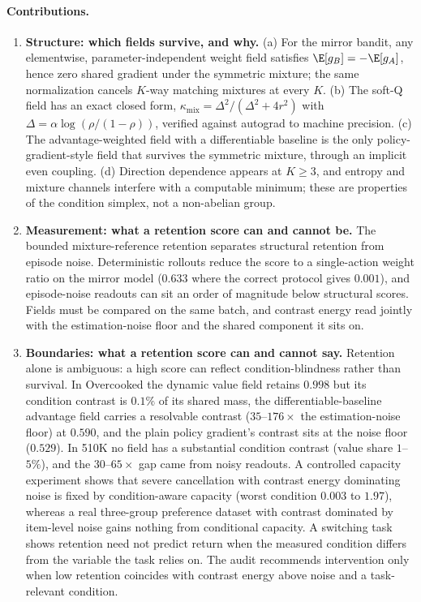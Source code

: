 \documentclass{article}
\newcommand{\kmix}{\kappa_{\mathrm{mix}}}
\begin{document}
\paragraph{Contributions.}
\begin{enumerate}
\item \textbf{Structure: which fields survive, and why.}
  (a) For the mirror bandit, any elementwise, parameter-independent weight
  field satisfies $\E[g_B]=-\E[g_A]$, hence zero shared gradient under the
  symmetric mixture; the same normalization cancels $K$-way matching mixtures
  at every $K$. (b) The soft-Q field has an exact closed form,
  $\kmix=\Delta^2/(\Delta^2+4r^2)$ with
  $\Delta=\alpha\log(\rho/(1-\rho))$, verified against autograd to machine
  precision. (c) The advantage-weighted field with a differentiable baseline
  is the only policy-gradient-style field that survives the symmetric mixture,
  through an implicit even coupling. (d) Direction dependence appears at
  $K\ge 3$, and entropy and mixture channels interfere with a computable
  minimum; these are properties of the condition simplex, not a non-abelian
  group.
\item \textbf{Measurement: what a retention score can and cannot be.}
  The bounded mixture-reference retention separates structural retention from
  episode noise. Deterministic rollouts reduce the score to a single-action
  weight ratio on the mirror model ($0.633$ where the correct protocol gives
  $0.001$), and episode-noise readouts can sit an order of magnitude below
  structural scores. Fields must be compared on the same batch, and contrast
  energy read jointly with the estimation-noise floor and the shared
  component it sits on.
\item \textbf{Boundaries: what a retention score can and cannot say.}
  Retention alone is ambiguous: a high score can reflect condition-blindness
  rather than survival. In Overcooked the dynamic value field retains $0.998$
  but its condition contrast is $0.1\%$ of its shared mass, the
  differentiable-baseline advantage field carries a resolvable contrast
  ($35$--$176\times$ the estimation-noise floor) at $0.590$, and the plain
  policy gradient's contrast sits at the noise floor ($0.529$). In 510K no
  field has a substantial condition contrast (value share $1$--$5\%$), and the
  $30$--$65\times$ gap came from noisy readouts. A
  controlled capacity experiment shows that severe cancellation with contrast
  energy dominating noise is fixed by condition-aware capacity (worst
  condition $0.003$ to $1.97$), whereas a real three-group preference dataset
  with contrast dominated by item-level noise gains nothing from conditional
  capacity. A switching task shows retention need not predict return when the
  measured condition differs from the variable the task relies on. The audit
  recommends intervention only when low retention coincides with contrast
  energy above noise and a task-relevant condition.
\end{enumerate}
\end{document}
